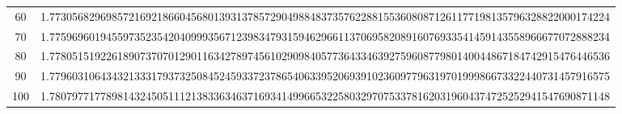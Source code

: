 \documentclass[final]{article}
\begin{document}
\begin{table}
\begin{center}
\begin{tabular}{|c|c|}
60  &   1.773056829698572169218660456801393137857290498848373576228815536080871261177198135796328822000174224   \\
70  &   1.775969601945597352354204099935671239834793159462966113706958208916076933541459143558966677072888234   \\
80  &   1.778051519226189073707012901163427897456102909840577364334639275960877980140044867184742915476446536   \\
90  &   1.779603106434321333179373250845245933723786540633952069391023609779631970199986673322440731457916575   \\
100 &   1.780797717789814324505111213833634637169341499665322580329707533781620319604374725252941547690871148   \\
\hline
\hline
\end{tabular}
\end{center}
\bigskip\bigskip
\end{table}
\end{document}
